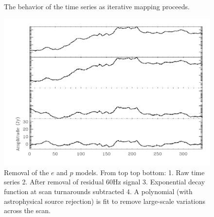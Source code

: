 \documentclass[12pt,preprint]{aastex}
\begin{document}
\begin{figure}
\caption{The behavior of the time series as iterative mapping proceeds.}
\label{fig:IterativeMapping}

\renewcommand{\thefigure}{\arabic{figure}\alph{subfig}}

\addtocounter{figure}{-1}
  
  \begin{minipage}{6.5in}
    \begin{center}
      \includegraphics[scale=0.9]{f6a}%
      \caption{Removal of the $e$ and $p$ models.  From top top
      bottom: 1. Raw time series 2. After removal of residual 60Hz
      signal 3. Exponential decay function at scan turnarounds
      subtracted 4. A polynomial (with astrophysical source rejection)
      is fit to remove large-scale variations across the scan. }
    \label{fig:IterativeMapping-a}
    \end{center}
  \end{minipage}
\end{figure}

\renewcommand{\thefigure}{\arabic{figure}\alph{subfig}}

\addtocounter{figure}{-1}
\addtocounter{subfig}{1}
  
\end{document}
